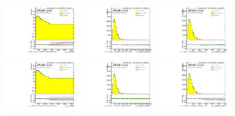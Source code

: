 \begin{figure}[htbp!]
\begin{center}
\includegraphics[width=0.25\textwidth,angle=-90]{figures/boosted/Reweight/Fits/Moriond_bkg_3_NoTag_2Trk_split_lead_Incl_sublHCand_Pt_m_1.pdf}
\includegraphics[width=0.25\textwidth,angle=-90]{figures/boosted/Reweight/Fits/Moriond_bkg_3_NoTag_2Trk_split_lead_Incl_sublHCand_trk0_Pt.pdf}
\includegraphics[width=0.25\textwidth,angle=-90]{figures/boosted/Reweight/Fits/Moriond_bkg_3_NoTag_2Trk_split_lead_Incl_sublHCand_trk1_Pt.pdf} \\
\includegraphics[width=0.25\textwidth,angle=-90]{figures/boosted/Reweight/Fits/Moriond_bkg_9_NoTag_2Trk_split_lead_Incl_sublHCand_Pt_m_1.pdf}
\includegraphics[width=0.25\textwidth,angle=-90]{figures/boosted/Reweight/Fits/Moriond_bkg_9_NoTag_2Trk_split_lead_Incl_sublHCand_trk0_Pt.pdf}
\includegraphics[width=0.25\textwidth,angle=-90]{figures/boosted/Reweight/Fits/Moriond_bkg_9_NoTag_2Trk_split_lead_Incl_sublHCand_trk1_Pt.pdf} \\

\end{center}
\end{figure}
